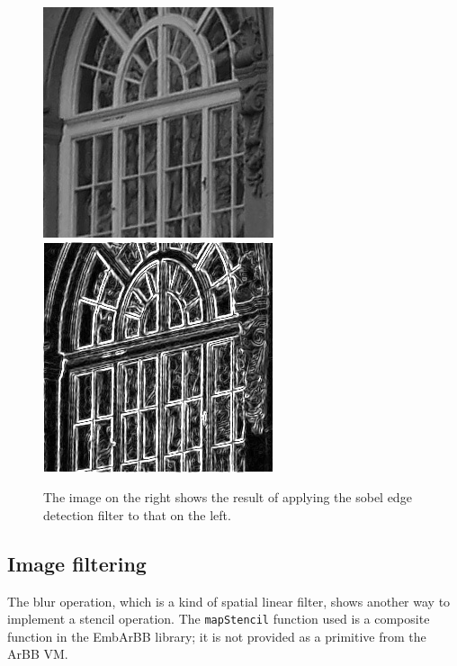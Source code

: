 \begin{figure}
\includegraphics[width=.5\linewidth]{./embarbb/img/window}
\includegraphics[width=.5\linewidth]{./embarbb/img/sobout}
\caption{ The image on the right shows the result of applying the sobel edge 
          detection filter to that on the left. }
\label{fig:sobel}
\end{figure}




\FloatBarrier

\subsection{Image filtering} 
\label{sec:Blur}
The blur operation, which is a kind of spatial linear filter, shows another way to implement a stencil operation. The {\tt mapStencil} function used is a composite 
function in the EmbArBB library; it is not provided as a primitive from 
the ArBB VM. 

